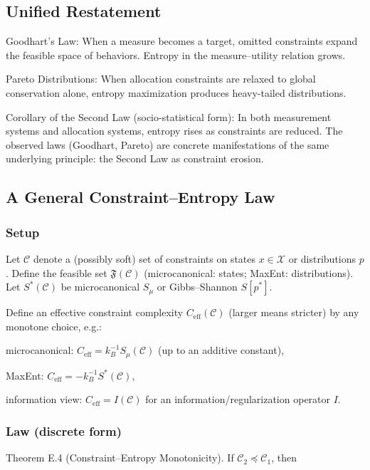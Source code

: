 \documentclass{article}
\begin{document}
\subsection{Unified Restatement}

Goodhart’s Law: When a measure becomes a target, omitted constraints expand the feasible space of behaviors. Entropy in the measure–utility relation grows.

Pareto Distributions: When allocation constraints are relaxed to global conservation alone, entropy maximization produces heavy-tailed distributions.

Corollary of the Second Law (socio-statistical form): In both measurement systems and allocation systems, entropy rises as constraints are reduced. The observed laws (Goodhart, Pareto) are concrete manifestations of the same underlying principle: the Second Law as constraint erosion.

\subsection{A General Constraint–Entropy Law}

\subsubsection{Setup}

Let $\mathcal{C}$ denote a (possibly soft) set of constraints on states $x\in\mathcal{X}$ or distributions $p$.
Define the feasible set $\mathfrak{F}(\mathcal{C})$ (microcanonical: states; MaxEnt: distributions).
Let $S^*(\mathcal{C})$ be microcanonical $S_\mu$ or Gibbs–Shannon $S[p^*]$.

Define an effective constraint complexity $C_{\mathrm{eff}}(\mathcal{C})$ (larger means stricter) by any monotone choice, e.g.:

microcanonical: $C_{\mathrm{eff}}=k_B^{-1} S_\mu(\mathcal{C})$ (up to an additive constant),

MaxEnt: $C_{\mathrm{eff}}=-k_B^{-1} S^*(\mathcal{C})$,

information view: $C_{\mathrm{eff}}=I(\mathcal{C})$ for an information/regularization operator $I$.

\subsubsection{Law (discrete form)}

Theorem E.4 (Constraint–Entropy Monotonicity).
If $\mathcal{C}_2 \preceq \mathcal{C}_1$, then
\end{document}
